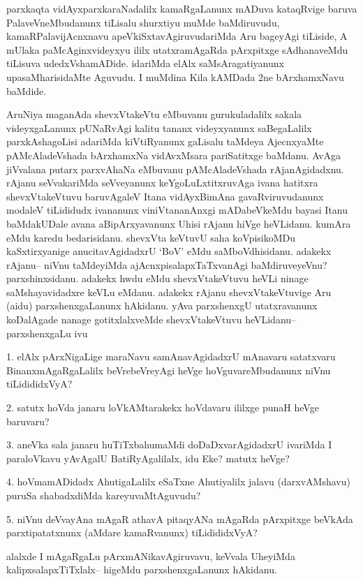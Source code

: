 \begin{artha}
parxkaqta vidAyxparxkaraNadalilx kamaRgaLanunx mADuva kataqRvige baruva PalaveVneMbudanunx tiLisalu shurxtiyu muMde baMdiruvudu, kamaRPalavijAcnxnavu apeVkiSxtavAgiruvudariMda Aru bageyAgi tiLiside, A mUlaka paMcAginxvideyxyu ililx utatxramAgaRda pArxpitxge sAdhanaveMdu tiLisuva udedxVshamADide. idariMda elAlx saMsAragatiyanunx upasaMharisidaMte Aguvudu. I muMdina Kila kAMDada 2ne bArxhamxNavu baMdide.
\end{artha}

\begin{artha}
AruNiya maganAda shevxVtakeVtu eMbuvanu gurukuladalilx sakala videyxgaLanunx pUNaRvAgi kalitu tananx videyxyanunx saBegaLalilx  parxkAshagoLisi adariMda kiVtiRyanunx gaLisalu taMdeya AjecnxyaMte pAMcAladeVshada bArxhamxNa vidAvxMsara pariSatitxge baMdanu. AvAga jiVvalana putarx parxvAhaNa eMbuvanu pAMcAladeVshada rAjanAgidadxnu. rAjanu seVvakariMda seVveyanunx keYgoLuLxtitxruvAga ivana hatitxra shevxVtakeVtuvu baruvAgaleV Itana vidAyxBimAna gavaRviruvudanunx modaleV tiLididudx ivananunx viniVtananAnxgi mADabeVkeMdu  bayasi Itanu baMdakUDale avana aBipArxyavanunx Uhisi rAjanu hiVge heVLidanu. kumAra eMdu karedu bedarisidanu. shevxVta keVtuvU saha koVpisikoMDu kaSxtirxyanige anucitavAgidadxrU `BoV' eMdu saMboVdhisidanu. adakekx rAjanu{\rm --} niVnu taMdeyiMda ajAcnxpisalapxTaTxvanAgi baMdiruveyeVnu? parxshinxsidanu. adakekx hwdu eMdu shevxVtakeVtuvu heVLi ninage saMshayavidadxre keVLu eMdanu. adakekx rAjanu shevxVtakeVtuvige Aru (aidu) parxshenxgaLanunx hAkidanu. yAva parxshenxgU utatxravanunx koDalAgade nanage gotitxlalxveMde shevxVtakeVtuvu heVLidanu{\rm --} parxshenxgaLu ivu

1. elAlx pArxNigaLige maraNavu samAnavAgidadxrU mAnavaru satatxvaru BinanxmAgaRgaLalilx beVrebeVreyAgi heVge hoVguvareMbudanunx niVnu tiLidididxVyA?

2. satutx hoVda janaru loVkAMtarakekx hoVdavaru ililxge punaH heVge baruvaru?

3. aneVka sala janaru huTiTxbahumaMdi doDaDxvarAgidadxrU ivariMda I paraloVkavu yAvAgalU BatiRyAgalilalx, idu Eke? matutx heVge?

4. hoVmamADidadx AhutigaLalilx eSaTxne Ahutiyalilx jalavu (darxvAMshavu) puruSa shabadxdiMda kareyuvaMtAguvudu?

5. niVnu deVvayAna mAgaR athavA pitaqyANa mAgaRda pArxpitxge beVkAda parxtipatatxnunx (aMdare kamaRvanunx) tiLidididxVyA?

alalxde I mAgaRgaLu pArxmANikavAgiruvavu, keVvala UheyiMda kalipxsalapxTiTxlalx{\rm --} higeMdu parxshenxgaLanunx hAkidanu. 
\end{artha}

